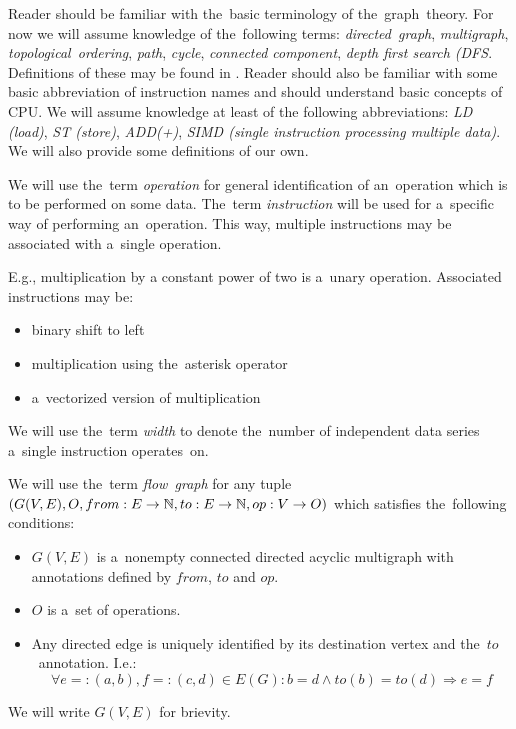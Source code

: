 Reader should be familiar with the~basic terminology of the~graph~theory. For now we will assume knowledge of the~following terms: \emph{directed~graph}, \emph{multigraph}, \emph{topological~ordering}, \emph{path}, \emph{cycle}, \emph{connected component}, \emph{depth first search (DFS}. Definitions of these may be found in \cite{kapitoly}. Reader should also be familiar with some basic abbreviation of instruction names and should understand basic concepts of CPU. We will assume knowledge at least of the following abbreviations: \emph{LD (load)}, \emph{ST (store)}, \emph{ADD(+)}, \emph{SIMD (single instruction processing multiple data)}. We will also provide some definitions of our own.

\begin{define}
We will use the~term \emph{operation} for general identification of an~operation which is to be performed on some data. The~term \emph{instruction} will be used for a~specific way of performing an~operation. This way, multiple instructions may be associated with a~single operation.
\end{define}

E.g., multiplication by a constant power of two is a~unary operation. Associated instructions may be:
\begin{itemize}
  \item binary shift to left
  \item multiplication using the~asterisk operator
  \item a~vectorized version of multiplication
\end{itemize}

\begin{define}
We will use the~term \emph{width} to denote the~number of independent data series a~single instruction operates~on.
\end{define}

\begin{define}
We will use the~term \emph{flow~graph} for any tuple $(G(V,E),O,from:E \rightarrow \mathbb{N}, to:E \rightarrow \mathbb{N}, op:V \rightarrow O)$ which satisfies the~following conditions:
\begin{itemize}
  \item $G(V,E)$ is a~nonempty connected directed acyclic multigraph with annotations defined by $from$, $to$ and $op$.
  \item $O$ is a~set of operations.
  \item Any directed edge is uniquely identified by its destination vertex and the~$to$~annotation. I.e.:
    $$ \forall{e=:(a,b),f=:(c,d)} \in {E(G)}: b = d \wedge to(b) = to(d) \Rightarrow e = f $$
\end {itemize}
    We will write $G(V,E)$ for brievity.
\end{define}

